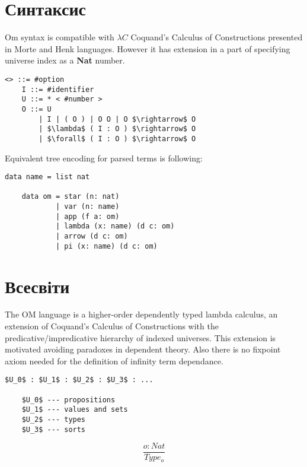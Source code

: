    \section{Синтаксис}
\vspace{0.5cm}
   Om syntax is compatible with $\lambda C$ Coquand's Calculus of Constructions presented
   in Morte and Henk languages. However it has extension in a part of specifying
   universe index as a {\bf Nat} number.

\vspace{0.5cm}
\begin{lstlisting}[mathescape=true]
   <> ::= #option
    I ::= #identifier
    U ::= * < #number >
    O ::= U
        | I | ( O ) | O O | O $\rightarrow$ O
        | $\lambda$ ( I : O ) $\rightarrow$ O
        | $\forall$ ( I : O ) $\rightarrow$ O
\end{lstlisting}

Equivalent tree encoding for parsed terms is following:
\vspace{0.5cm}
\begin{lstlisting}[mathescape=true]
    data name = list nat

    data om = star (n: nat)
            | var (n: name)
            | app (f a: om)
            | lambda (x: name) (d c: om)
            | arrow (d c: om)
            | pi (x: name) (d c: om)
\end{lstlisting}

\newpage
\section{Всесвіти}

The OM language is a higher-order dependently typed lambda calculus,
an extension of Coquand's Calculus of Constructions
with the predicative/impredicative hierarchy of indexed universes.
This extension is motivated avoiding paradoxes in dependent theory.
Also there is no fixpoint axiom needed for the definition
of infinity term dependance.

\vspace{0.5cm}
\begin{lstlisting}[mathescape=true]
    $U_0$ : $U_1$ : $U_2$ : $U_3$ : ...

    $U_0$ --- propositions
    $U_1$ --- values and sets
    $U_2$ --- types
    $U_3$ --- sorts
\end{lstlisting}

\begin{equation}
\tag{S}
\dfrac
{o : Nat}
{Type_o}
\end{equation}

